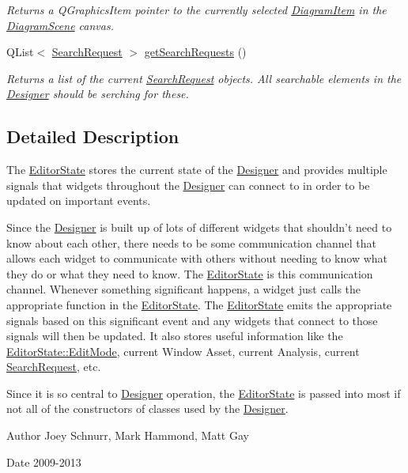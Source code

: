 \begin{DoxyCompactItemize}
\begin{DoxyCompactList}\small\item\em Returns a Q\-Graphics\-Item pointer to the currently selected \hyperlink{class_diagram_item}{Diagram\-Item} in the \hyperlink{class_diagram_scene}{Diagram\-Scene} canvas. \end{DoxyCompactList}\item 
Q\-List$<$ \hyperlink{struct_search_request}{Search\-Request} $>$ \hyperlink{class_editor_state_a5ea7b318475acaacb392831ba147bc8b}{get\-Search\-Requests} ()
\begin{DoxyCompactList}\small\item\em Returns a list of the current \hyperlink{struct_search_request}{Search\-Request} objects. All searchable elements in the \hyperlink{class_designer}{Designer} should be serching for these. \end{DoxyCompactList}\end{DoxyCompactItemize}


\subsection{Detailed Description}
The \hyperlink{class_editor_state}{Editor\-State} stores the current state of the \hyperlink{class_designer}{Designer} and provides multiple signals that widgets throughout the \hyperlink{class_designer}{Designer} can connect to in order to be updated on important events. 

Since the \hyperlink{class_designer}{Designer} is built up of lots of different widgets that shouldn't need to know about each other, there needs to be some communication channel that allows each widget to communicate with others without needing to know what they do or what they need to know. The \hyperlink{class_editor_state}{Editor\-State} is this communication channel. Whenever something significant happens, a widget just calls the appropriate function in the \hyperlink{class_editor_state}{Editor\-State}. The \hyperlink{class_editor_state}{Editor\-State} emits the appropriate signals based on this significant event and any widgets that connect to those signals will then be updated. It also stores useful information like the \hyperlink{class_editor_state_a30123e595784b2228edc2a0c2b46ab28}{Editor\-State\-::\-Edit\-Mode}, current Window Asset, current Analysis, current \hyperlink{struct_search_request}{Search\-Request}, etc.

Since it is so central to \hyperlink{class_designer}{Designer} operation, the \hyperlink{class_editor_state}{Editor\-State} is passed into most if not all of the constructors of classes used by the \hyperlink{class_designer}{Designer}. \begin{DoxyAuthor}{Author}
Joey Schnurr, Mark Hammond, Matt Gay 
\end{DoxyAuthor}
\begin{DoxyDate}{Date}
2009-\/2013 
\end{DoxyDate}


